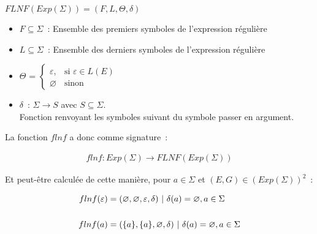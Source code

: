 \vphantom{}

\begin{center}
    \(FLNF(Exp(\Sigma)) = (F, L, \Theta, \delta)\)

    \begin{itemize}
        \item[\textbullet] \(F \subseteq \Sigma\)~: Ensemble des premiers
            symboles de l'expression régulière

            \vphantom{}

        \item[\textbullet] \(L \subseteq \Sigma\)~: Ensemble des derniers
            symboles de l'expression régulière

            \vphantom{}

        \item[\textbullet] \(\Theta\) =
            \(
            \begin{cases}
                \varepsilon, & \text{si } \varepsilon \in L(E) \\
                \varnothing  & \text{sinon}
            \end{cases}
            \)

            \vphantom{}

        \item[\textbullet] \(\delta\)~: \(\Sigma \to S\) avec \(S \subseteq
            \Sigma\). \\
            Fonction renvoyant les symboles suivant du symbole passer en argument.
    \end{itemize}
\end{center}

La fonction \(flnf\) a donc comme signature~:

\begin{align}
    flnf: Exp(\Sigma) \to FLNF(Exp(\Sigma))
\end{align}

Et peut-être calculée de cette manière, pour \(a \in \Sigma\) et \((E, G) \in
(Exp(\Sigma))^2\)~:

\begin{align}
    flnf(\varepsilon) & = (\varnothing, \varnothing, \varepsilon, \delta) ~|~ \delta(a) = \varnothing, a \in \Sigma \\
    \vphantom{} \notag                                                                                              \\
    flnf(a)           & = (\{a\}, \{a\}, \varnothing, \delta) ~|~ \delta(a) = \varnothing, a
    \in \Sigma
\end{align}

